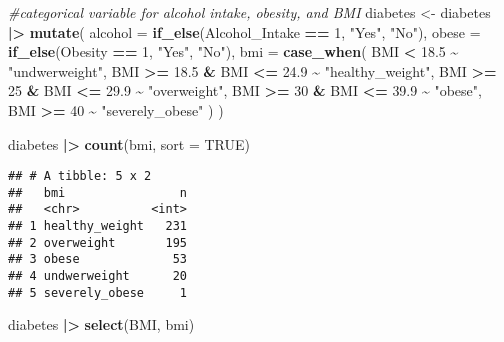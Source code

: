 \documentclass[
]{article}
\newenvironment{Shaded}{\begin{snugshade}}{\end{snugshade}}
\newcommand{\AttributeTok}[1]{\textcolor[rgb]{0.13,0.29,0.53}{#1}}
\newcommand{\CommentTok}[1]{\textcolor[rgb]{0.56,0.35,0.01}{\textit{#1}}}
\newcommand{\ConstantTok}[1]{\textcolor[rgb]{0.56,0.35,0.01}{#1}}
\newcommand{\DecValTok}[1]{\textcolor[rgb]{0.00,0.00,0.81}{#1}}
\newcommand{\FloatTok}[1]{\textcolor[rgb]{0.00,0.00,0.81}{#1}}
\newcommand{\FunctionTok}[1]{\textcolor[rgb]{0.13,0.29,0.53}{\textbf{#1}}}
\newcommand{\NormalTok}[1]{#1}
\newcommand{\OtherTok}[1]{\textcolor[rgb]{0.56,0.35,0.01}{#1}}
\newcommand{\SpecialCharTok}[1]{\textcolor[rgb]{0.81,0.36,0.00}{\textbf{#1}}}
\newcommand{\StringTok}[1]{\textcolor[rgb]{0.31,0.60,0.02}{#1}}
\begin{document}
\begin{Shaded}
\begin{Highlighting}[]
\CommentTok{\#categorical variable for alcohol intake, obesity, and BMI}
\NormalTok{diabetes }\OtherTok{\textless{}{-}}\NormalTok{ diabetes }\SpecialCharTok{|\textgreater{}}
  \FunctionTok{mutate}\NormalTok{(}
    \AttributeTok{alcohol =} \FunctionTok{if\_else}\NormalTok{(Alcohol\_Intake }\SpecialCharTok{==} \DecValTok{1}\NormalTok{, }\StringTok{"Yes"}\NormalTok{, }\StringTok{"No"}\NormalTok{),}
    \AttributeTok{obese =} \FunctionTok{if\_else}\NormalTok{(Obesity }\SpecialCharTok{==} \DecValTok{1}\NormalTok{, }\StringTok{"Yes"}\NormalTok{, }\StringTok{"No"}\NormalTok{),}
    \AttributeTok{bmi =} \FunctionTok{case\_when}\NormalTok{(}
\NormalTok{      BMI }\SpecialCharTok{\textless{}} \FloatTok{18.5} \SpecialCharTok{\textasciitilde{}} \StringTok{"undwerweight"}\NormalTok{,}
\NormalTok{      BMI }\SpecialCharTok{\textgreater{}=} \FloatTok{18.5} \SpecialCharTok{\&}\NormalTok{ BMI }\SpecialCharTok{\textless{}=} \FloatTok{24.9} \SpecialCharTok{\textasciitilde{}} \StringTok{"healthy\_weight"}\NormalTok{,}
\NormalTok{      BMI }\SpecialCharTok{\textgreater{}=} \DecValTok{25} \SpecialCharTok{\&}\NormalTok{ BMI }\SpecialCharTok{\textless{}=} \FloatTok{29.9} \SpecialCharTok{\textasciitilde{}} \StringTok{"overweight"}\NormalTok{,}
\NormalTok{      BMI }\SpecialCharTok{\textgreater{}=} \DecValTok{30} \SpecialCharTok{\&}\NormalTok{ BMI }\SpecialCharTok{\textless{}=} \FloatTok{39.9} \SpecialCharTok{\textasciitilde{}} \StringTok{"obese"}\NormalTok{,}
\NormalTok{      BMI }\SpecialCharTok{\textgreater{}=} \DecValTok{40} \SpecialCharTok{\textasciitilde{}} \StringTok{"severely\_obese"}
\NormalTok{    )}
\NormalTok{  )}

\NormalTok{diabetes }\SpecialCharTok{|\textgreater{}}
  \FunctionTok{count}\NormalTok{(bmi, }\AttributeTok{sort =} \ConstantTok{TRUE}\NormalTok{)}
\end{Highlighting}
\end{Shaded}

\begin{verbatim}
## # A tibble: 5 x 2
##   bmi                n
##   <chr>          <int>
## 1 healthy_weight   231
## 2 overweight       195
## 3 obese             53
## 4 undwerweight      20
## 5 severely_obese     1
\end{verbatim}

\begin{Shaded}
\begin{Highlighting}[]
\NormalTok{diabetes }\SpecialCharTok{|\textgreater{}}
  \FunctionTok{select}\NormalTok{(BMI, bmi)}
\end{Highlighting}
\end{Shaded}
\end{document}
